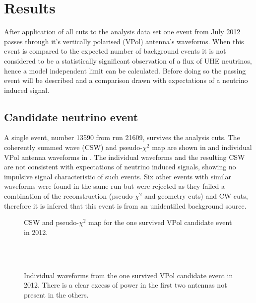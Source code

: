 \chapter{Results}
\label{chap:Results}

After application of all cuts to the analysis data set one event from July 2012 passes through it's vertically polarised (VPol) antenna's waveforms. When this event is compared to the expected number of background events it is not considered to be a statistically significant observation of a flux of UHE neutrinos, hence a model independent limit can be calculated. Before doing so the passing event will be described and a comparison drawn with expectations of a neutrino induced signal.



\section{Candidate neutrino event}
\label{sec:Results:Neutrino-Candidate}

A single event, number 13590 from run 21609, survives the analysis cuts. The coherently summed wave (CSW) and pseudo-$\chi^{2}$ map are shown in  and individual VPol antenna waveforms in . The individual waveforms and the resulting CSW are not consistent with expectations of neutrino induced signals, showing no impulsive signal characteristic of such events. Six other events with similar waveforms were found in the same run but were rejected as they failed a combination of the reconstruction (pseudo-$\chi^{2}$ and geometry cuts) and CW cuts, therefore it is infered that this event is from an unidentified background source. 

\begin{figure}
  \hfill
  \caption{CSW and pseudo-$\chi^{2}$ map for the one survived VPol candidate event in 2012.}
  \label{fig:Results:CSW-ChiSq}
\end{figure}


\begin{figure}
  \hfill
  \\
  \hfill
  \
  \caption{Individual waveforms from the one survived VPol candidate event in 2012. There is a clear excess of power in the first two antennas not present in the others.}
  \label{fig:Results:Waveforms}
\end{figure}


